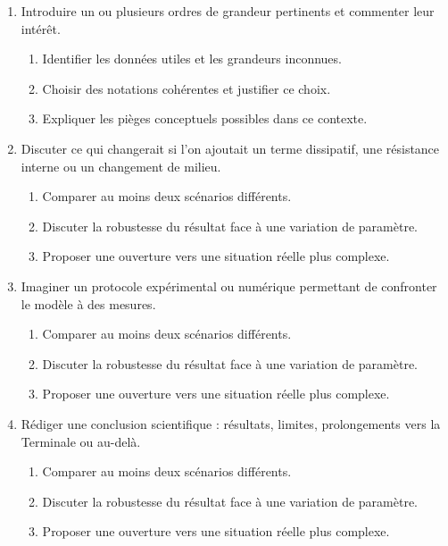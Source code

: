\documentclass[11pt,a4paper]{article}
\begin{document}
\begin{enumerate}[label=\textbf{Très long \arabic*.},leftmargin=*]
\begin{enumerate}[label=\textbf{\arabic*)}]
\begin{enumerate}[label=\alph*)]
\item Écrire les relations physiques pertinentes sous forme littérale.
\item Préciser quelles grandeurs sont supposées constantes et lesquelles peuvent varier.
\item Interpréter physiquement chaque terme.
\end{enumerate}
\item Introduire un ou plusieurs ordres de grandeur pertinents et commenter leur intérêt.
\begin{enumerate}[label=\alph*)]
\item Identifier les données utiles et les grandeurs inconnues.
\item Choisir des notations cohérentes et justifier ce choix.
\item Expliquer les pièges conceptuels possibles dans ce contexte.
\end{enumerate}
\item Discuter ce qui changerait si l'on ajoutait un terme dissipatif, une résistance interne ou un changement de milieu.
\begin{enumerate}[label=\alph*)]
\item Comparer au moins deux scénarios différents.
\item Discuter la robustesse du résultat face à une variation de paramètre.
\item Proposer une ouverture vers une situation réelle plus complexe.
\end{enumerate}
\item Imaginer un protocole expérimental ou numérique permettant de confronter le modèle à des mesures.
\begin{enumerate}[label=\alph*)]
\item Comparer au moins deux scénarios différents.
\item Discuter la robustesse du résultat face à une variation de paramètre.
\item Proposer une ouverture vers une situation réelle plus complexe.
\end{enumerate}
\item Rédiger une conclusion scientifique : résultats, limites, prolongements vers la Terminale ou au-delà.
\begin{enumerate}[label=\alph*)]
\item Comparer au moins deux scénarios différents.
\item Discuter la robustesse du résultat face à une variation de paramètre.
\item Proposer une ouverture vers une situation réelle plus complexe.

\end{enumerate}
\end{enumerate}
\end{enumerate}
\end{document}
